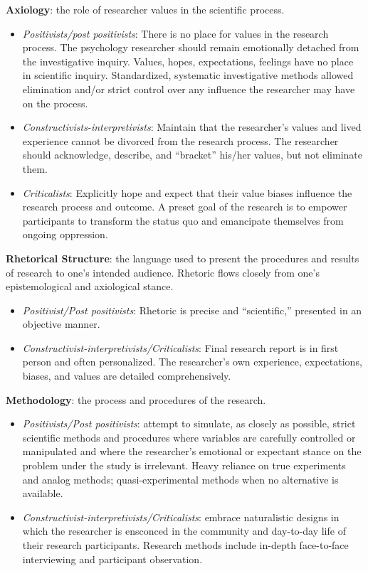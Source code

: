 \documentclass[
  english,
]{book}
\providecommand{\tightlist}{%
  \setlength{\itemsep}{0pt}\setlength{\parskip}{0pt}}
\begin{document}
\textbf{Axiology}: the role of researcher values in the scientific process.

\begin{itemize}
\tightlist
\item
  \emph{Positivists/post positivists}: There is no place for values in the research process. The psychology researcher should remain emotionally detached from the investigative inquiry. Values, hopes, expectations, feelings have no place in scientific inquiry. Standardized, systematic investigative methods allowed elimination and/or strict control over any influence the researcher may have on the process.
\item
  \emph{Constructivists-interpretivists}: Maintain that the researcher's values and lived experience cannot be divorced from the research process. The researcher should acknowledge, describe, and ``bracket'' his/her values, but not eliminate them.
\item
  \emph{Criticalists}: Explicitly hope and expect that their value biases influence the research process and outcome. A preset goal of the research is to empower participants to transform the status quo and emancipate themselves from ongoing oppression.
\end{itemize}

\textbf{Rhetorical Structure}: the language used to present the procedures and results of research to one's intended audience. Rhetoric flows closely from one's epistemological and axiological stance.

\begin{itemize}
\tightlist
\item
  \emph{Positivist/Post positivists}: Rhetoric is precise and ``scientific,'' presented in an objective manner.
\item
  \emph{Constructivist-interpretivists/Criticalists}: Final research report is in first person and often personalized. The researcher's own experience, expectations, biases, and values are detailed comprehensively.
\end{itemize}

\textbf{Methodology}: the process and procedures of the research.

\begin{itemize}
\tightlist
\item
  \emph{Positivists/Post positivists}: attempt to simulate, as closely as possible, strict scientific methods and procedures where variables are carefully controlled or manipulated and where the researcher's emotional or expectant stance on the problem under the study is irrelevant. Heavy reliance on true experiments and analog methods; quasi-experimental methods when no alternative is available.
\item
  \emph{Constructivist-interpretivists/Criticalists}: embrace naturalistic designs in which the researcher is ensconced in the community and day-to-day life of their research participants. Research methods include in-depth face-to-face interviewing and participant observation.
\end{itemize}
\end{document}
